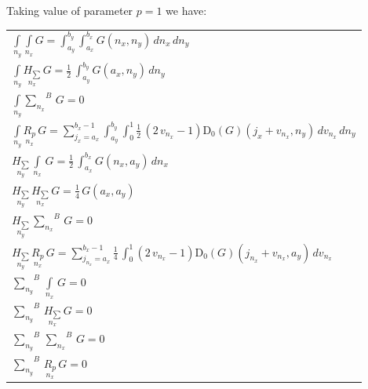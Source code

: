 \documentclass[11pt]{article}
\begin{document}
Taking value of parameter \(p = 1\) we have:

    \begin{center}
\begin{tabular}{ | l | }
\hline

$\int\limits_{n_y}^{} \int\limits_{n_x}^{} G = \int_{a_{y}}^{b_{y}} \int_{a_{x}}^{b_{x}} G\left(n_{x}, n_{y}\right)\,{d n_{x}}\,{d n_{y}}$ \\

$\int\limits_{n_y}^{} \underset{n_x}{H_{\sum}}\,G = \frac{1}{2} \, \int_{a_{y}}^{b_{y}} G\left(a_{x}, n_{y}\right)\,{d n_{y}}$ \\

$\int\limits_{n_y}^{} {\sum\limits_{n_x}^{}}^{B}\,G = 0$ \\

$\int\limits_{n_y}^{} \underset{n_x}{R_{p}}\,G = {\sum_{j_{x}=a_{x}}^{b_{x} - 1} \int_{a_{y}}^{b_{y}} \int_{0}^{1} \frac{1}{2} \, {\left(2 \, v_{n_{x}} - 1\right)} \mathrm{D}_{0}\left(G\right)\left(j_{x} + v_{n_{x}}, n_{y}\right)\,{d v_{n_{x}}}\,{d n_{y}}}$ \\

\hline\hline

$\underset{n_y}{H_{\sum}}\,\int\limits_{n_x}^{}\,G = \frac{1}{2} \, \int_{a_{x}}^{b_{x}} G\left(n_{x}, a_{y}\right)\,{d n_{x}}$ \\

$\underset{n_y}{H_{\sum}}\,\underset{n_x}{H_{\sum}}\,G = \frac{1}{4} \, G\left(a_{x}, a_{y}\right)$ \\

$\underset{n_y}{H_{\sum}}\,{\sum\limits_{n_x}^{}}^{B}\,G = 0$ \\

$\underset{n_y}{H_{\sum}}\,\underset{n_x}{R_{p}}\,G = {\sum_{j_{n_{x}}=a_{x}}^{b_{x} - 1} \frac{1}{4} \, \int_{0}^{1} \left(2 \, v_{n_{x}} - 1 \right) \mathrm{D}_{0}\left(G\right)\left(j_{n_{x}} + v_{n_{x}}, a_{y}\right)\,{d v_{n_{x}}} }$ \\

\hline\hline

${\sum\limits_{n_y}^{}}^{B}\,\int\limits_{n_x}^{}\,G = 0$ \\

${\sum\limits_{n_y}^{}}^{B}\,\underset{n_x}{H_{\sum}}\,G = 0$ \\

${\sum\limits_{n_y}^{}}^{B}\,{\sum\limits_{n_x}^{}}^{B}\,G = 0$ \\

${\sum\limits_{n_y}^{}}^{B}\,\underset{n_x}{R_{p}}\,G = 0$ \\


\end{tabular}
\end{center}
\end{document}
